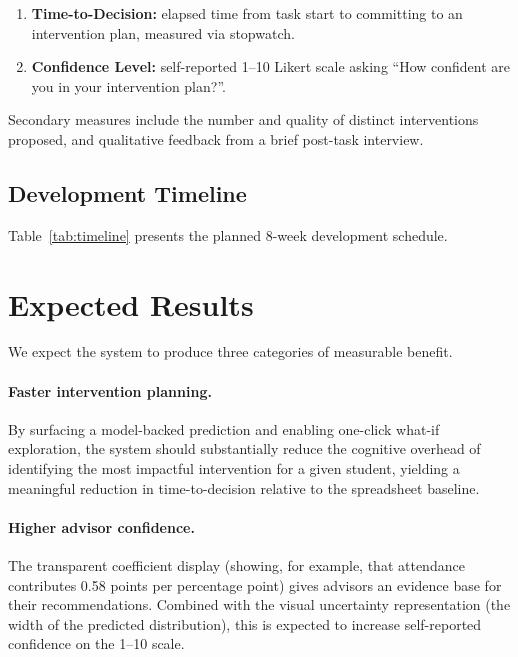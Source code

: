 \documentclass[11pt]{article}
\begin{document}
\begin{enumerate}
  \item \textbf{Time-to-Decision:} elapsed time from task start to committing to an intervention plan, measured via stopwatch.
  \item \textbf{Confidence Level:} self-reported 1--10 Likert scale asking ``How confident are you in your intervention plan?''.
\end{enumerate}

Secondary measures include the number and quality of distinct interventions proposed, and qualitative feedback from a brief post-task interview.

\subsection{Development Timeline}

Table~\ref{tab:timeline} presents the planned 8-week development schedule.



\section{Expected Results}
\label{sec:results}

We expect the system to produce three categories of measurable benefit.

\paragraph{Faster intervention planning.} By surfacing a model-backed prediction and enabling one-click what-if exploration, the system should substantially reduce the cognitive overhead of identifying the most impactful intervention for a given student, yielding a meaningful reduction in time-to-decision relative to the spreadsheet baseline.

\paragraph{Higher advisor confidence.} The transparent coefficient display (showing, for example, that attendance contributes 0.58 points per percentage point) gives advisors an evidence base for their recommendations. Combined with the visual uncertainty representation (the width of the predicted distribution), this is expected to increase self-reported confidence on the 1--10 scale.
\end{document}
